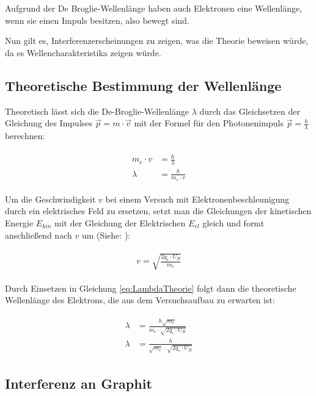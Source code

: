 Aufgrund der De Broglie-Wellenlänge haben auch Elektronen eine Wellenlänge, wenn sie einen Impuls besitzen, also bewegt sind.

Nun gilt es, Interferenzerscheinungen zu zeigen, was die Theorie beweisen würde, da es Wellencharakteristika zeigen würde.

\subsection{Theoretische Bestimmung der Wellenlänge}

Theoretisch lässt sich die De-Broglie-Wellenlänge $\lambda$ durch das Gleichsetzen der Gleichung des Impulses $\vec{p}=m\cdot\vec{v}$ mit der Formel für den Photonenimpuls $\vec{p}=\frac{h}{\lambda}$ berechnen:

\begin{align}	\label{eq:LambdaTheorie}
\begin{split}
	m_e \cdot v &= \frac{h}{\lambda} \\
	\lambda &= \frac{h}{m_e \cdot v}
\end{split}
\end{align}

Um die Geschwindigkeit $v$ bei einem Versuch mit Elektronenbeschleunigung durch ein elektrisches Feld zu ersetzen, setzt man die Gleichungen der kinetischen Energie $E_{kin}$ mit der Gleichung der Elektrischen $E_{el}$ gleich und formt anschließend nach $v$ um (Siehe: ):

\begin{align}
\begin{split}
	v = \sqrt{\frac{2q_e \cdot U_B}{m_e}}
\end{split}
\end{align}

\noindent Durch Einsetzen in Gleichung \ref{eq:LambdaTheorie} folgt dann die theoretische Wellenlänge des Elektrons, die aus dem Versuchsaufbau zu erwarten ist:

\begin{align}
\begin{split}
	\lambda &= \frac{h \sqrt{m_e}}{m_e \cdot \sqrt{2q_e \cdot U_B}} \\
	\lambda &= \frac{h}{\sqrt{m_e} \cdot \sqrt{2q_e \cdot U_B}}
\end{split}
\end{align}


\subsection{Interferenz an Graphit}

